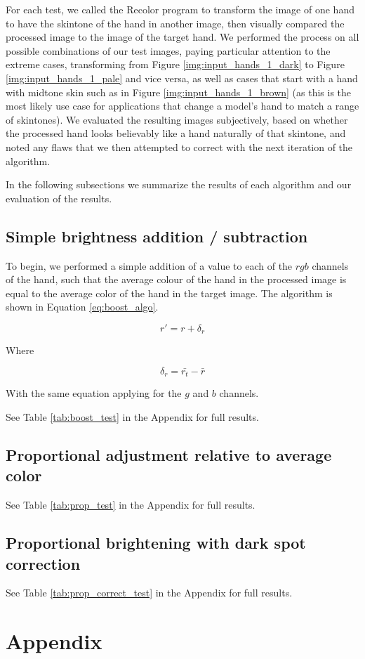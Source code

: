 \documentclass[12pt, a4paper]{article}
\newcommand*\mean[1]{\bar{#1}}
\begin{document}
 For each test, we called the Recolor program to transform the image of one hand to have the skintone of the hand in another image, then visually compared the processed image to the image of the target hand. We performed the process on all possible combinations of our test images, paying particular attention to the extreme cases, transforming from Figure \ref{img:input_hands_1_dark} to Figure \ref{img:input_hands_1_pale} and vice versa, as well as cases that start with a hand with midtone skin such as in Figure \ref{img:input_hands_1_brown} (as this is the most likely use case for applications that change a model's hand to match a range of skintones). We evaluated the resulting images subjectively, based on whether the processed hand looks believably like a hand naturally of that skintone, and noted any flaws that we then attempted to correct with the next iteration of the algorithm.

In the following subsections we summarize the results of each algorithm and our evaluation of the results.

\subsection{Simple brightness addition / subtraction}
To begin, we performed a simple addition of a value to each of the $rgb$ channels of the hand, such that the average colour of the hand in the processed image is equal to the average color of the hand in the target image. The algorithm is shown in Equation \ref{eq:boost_algo}.

\begin{equation} \label{eq:boost_algo}
r' = r + \delta_r
\end{equation}

Where 

\begin{equation*}
\delta_r = \mean{r_t} - \mean{r}
\end{equation*}

With the same equation applying for the $g$ and $b$ channels.

See Table \ref{tab:boost_test} in the Appendix for full results.

\subsection{Proportional adjustment relative to average color}
See Table \ref{tab:prop_test} in the Appendix for full results.

\subsection{Proportional brightening with dark spot correction}
See Table \ref{tab:prop_correct_test} in the Appendix for full results.

\pagebreak

\section*{Appendix}

\pagebreak

\pagebreak

\end{document}
